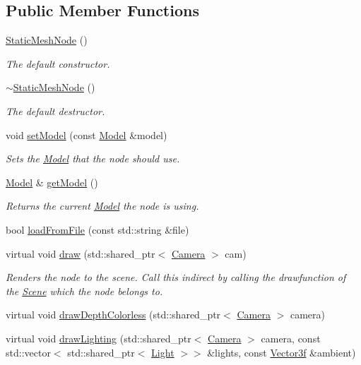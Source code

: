 \subsection*{Public Member Functions}
\begin{DoxyCompactItemize}
\item 
\hyperlink{classburn_1_1_static_mesh_node_a051ef5fe091cf8e93cc4dd1bae753cbd}{Static\-Mesh\-Node} ()
\begin{DoxyCompactList}\small\item\em The default constructor. \end{DoxyCompactList}\item 
\hyperlink{classburn_1_1_static_mesh_node_a68e00b329768da175ee153c46069364e}{$\sim$\-Static\-Mesh\-Node} ()
\begin{DoxyCompactList}\small\item\em The default destructor. \end{DoxyCompactList}\item 
void \hyperlink{classburn_1_1_static_mesh_node_aa89d9de19f56975acc63da0ca1eb3acc}{set\-Model} (const \hyperlink{classburn_1_1_model}{Model} \&model)
\begin{DoxyCompactList}\small\item\em Sets the \hyperlink{classburn_1_1_model}{Model} that the node should use. \end{DoxyCompactList}\item 
\hyperlink{classburn_1_1_model}{Model} \& \hyperlink{classburn_1_1_static_mesh_node_ab6caf5d20b137bb00032a81690a4ebfc}{get\-Model} ()
\begin{DoxyCompactList}\small\item\em Returns the current \hyperlink{classburn_1_1_model}{Model} the node is using. \end{DoxyCompactList}\item 
bool \hyperlink{classburn_1_1_static_mesh_node_a6c571030b013c2b72d85bf36952de724}{load\-From\-File} (const std\-::string \&file)
\item 
virtual void \hyperlink{classburn_1_1_static_mesh_node_a549592ca6fa617368511c8f68e3ca6d4}{draw} (std\-::shared\-\_\-ptr$<$ \hyperlink{classburn_1_1_camera}{Camera} $>$ cam)
\begin{DoxyCompactList}\small\item\em Renders the node to the scene. Call this indirect by calling the drawfunction of the \hyperlink{classburn_1_1_scene}{Scene} which the node belongs to. \end{DoxyCompactList}\item 
virtual void \hyperlink{classburn_1_1_static_mesh_node_ac33ab5c73d01867df4708783e01a87af}{draw\-Depth\-Colorless} (std\-::shared\-\_\-ptr$<$ \hyperlink{classburn_1_1_camera}{Camera} $>$ camera)
\item 
virtual void \hyperlink{classburn_1_1_static_mesh_node_a3bc717d99643f34a82443f89b24eae40}{draw\-Lighting} (std\-::shared\-\_\-ptr$<$ \hyperlink{classburn_1_1_camera}{Camera} $>$ camera, const std\-::vector$<$ std\-::shared\-\_\-ptr$<$ \hyperlink{classburn_1_1_light}{Light} $>$$>$ \&lights, const \hyperlink{namespaceburn_a9d6d349c94bc4dc9699427216128a0ef}{Vector3f} \&ambient)
\end{DoxyCompactItemize}
